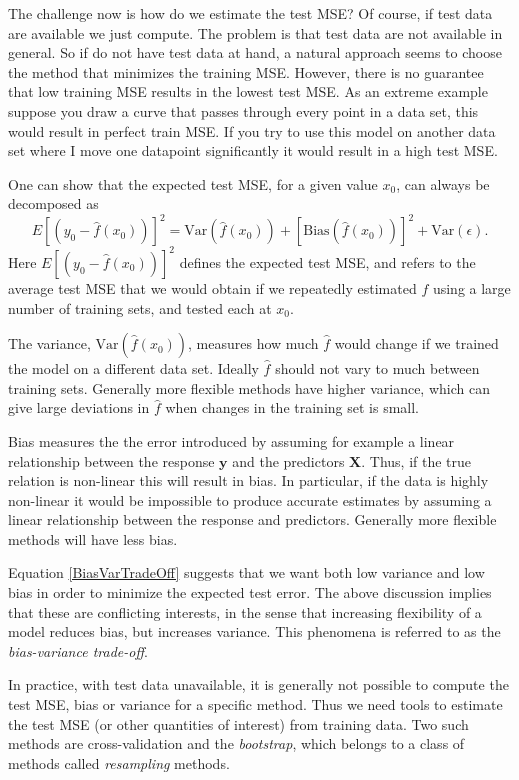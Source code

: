 \documentclass[a4paper, twocolumn]{article}
\begin{document}
The challenge now is how do we estimate the test MSE? Of course, if test data are available we just compute. The problem is  
that test data are not available in general. So if do not have test data at hand, a natural approach seems to choose 
the method that minimizes the training MSE. However, there is no guarantee that low training MSE results in the lowest test MSE. 
As an extreme example suppose you draw a curve that passes through every point in a data set, this would result in perfect train 
MSE. If you try to use this model on another data set where I move one datapoint significantly it would result in a high test MSE.

One can show that the expected test MSE, for a given value $x_0$, can always be decomposed as 
\begin{equation}
 E[(y_0 - \hat{f}(x_0))]^2 = \text{Var}(\hat{f}(x_0)) + [\text{Bias}(\hat{f}(x_0))]^2 + \text{Var}(\epsilon) \label{BiasVarTradeOff}.
\end{equation}
Here $E[(y_0 - \hat{f}(x_0))]^2$ defines the expected test MSE, and refers
to the average test MSE that we would obtain if we repeatedly estimated $f$ using a large number of training sets, 
and tested each at $x_0$. 

The variance, $\text{Var}(\hat{f}(x_0))$, measures how much $\hat{f}$ would change if we trained the 
model on a different data set. Ideally $\hat{f}$ should not vary to much between training sets. Generally more flexible methods 
have higher variance, which can give large deviations in $\hat{f}$ when changes in the training set is small.

Bias measures the the error introduced by assuming for example a linear relationship between the response $\mathbf{y}$ and the 
predictors $\mathbf{X}$. Thus, if the true relation is non-linear this will result in bias. In particular, if the data is highly 
non-linear it would be impossible to produce accurate estimates by assuming a linear relationship between the response and predictors.
Generally more flexible methods will have less bias. 

Equation \ref{BiasVarTradeOff} suggests that we want both low variance and low bias in order to minimize the expected 
test error. The above discussion implies that these are conflicting interests, in the sense that increasing flexibility of a model 
reduces bias, but increases variance. This phenomena is referred to as the \textit{bias-variance trade-off}.

In practice, with test data unavailable, it is generally not possible to compute the test MSE, bias or variance for a specific 
method. Thus we need tools to estimate the test MSE (or other quantities of interest) from training data. Two such methods are 
cross-validation and the \textit{bootstrap}, which belongs to a class of methods called \textit{resampling} methods.
\end{document}
